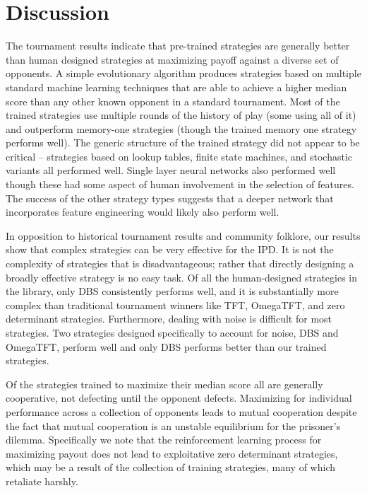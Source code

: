 \documentclass{article}
\begin{document}
\section{Discussion}

The tournament results indicate that pre-trained strategies are generally better
than human designed strategies at maximizing payoff against a diverse set of
opponents. A simple evolutionary algorithm produces strategies based on multiple
standard machine learning techniques that are able to achieve a higher median
score than any other known opponent in a standard tournament. Most of the trained
strategies use multiple rounds of the history of play (some using all of it) and
outperform memory-one strategies (though the trained memory one strategy performs
well). The generic structure of the trained strategy did not appear to be
critical -- strategies based on lookup tables, finite state machines, and stochastic
variants all performed well. Single layer neural networks also performed well
though these had some aspect of human involvement in the selection of features.
The success of the other strategy types suggests that a deeper network that
incorporates feature engineering would likely also perform well.

In opposition to historical tournament results and community folklore,
our results show that complex strategies can be very effective for the
IPD. It is not the complexity of strategies that is disadvantageous; rather that directly
designing a broadly effective strategy is no easy task. Of all the human-designed
strategies in the library, only DBS consistently performs well, and it is
substantially more complex than traditional tournament winners like TFT, OmegaTFT,
and zero determinant strategies. Furthermore, dealing with noise is difficult
for most strategies. Two strategies designed specifically to account for noise,
DBS and OmegaTFT, perform well and only DBS performs better than our trained
strategies.

Of the strategies trained to maximize their median score all are generally
cooperative, not defecting until the opponent defects. Maximizing for individual
performance across a collection of opponents leads to mutual cooperation despite
the fact that mutual cooperation is an unstable equilibrium for the prisoner's
dilemma. Specifically we note that the reinforcement learning process for maximizing
payout does not
lead to exploitative zero determinant strategies, which may be a result of the
collection of training strategies, many of which retaliate harshly.
\end{document}
